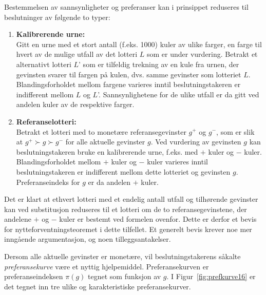 {{Bestemmelsen av sannsynligheter og preferanser kan i prinsippet reduseres til
beslutninger av følgende to typer:

\begin{enumerate}
\item {\bf Kalibrerende urne:}\\
      Gitt en urne med et stort antall (f.eks. 1000) kuler av ulike farger,
      en farge til hvert
      av de mulige utfall av det lotteri $L$ som er under vurdering.
      Betrakt et alternativt lotteri $L$' som er tilfeldig trekning av en kule
      fra urnen, der gevinsten svarer til fargen på kulen, dvs. samme 
      gevinster som lotteriet $L$.                            
      Blandingsforholdet mellom fargene varieres inntil beslutningstakeren
      er indifferent mellom $L$ og $L$'. Sannsynlighetene for de ulike utfall
      er da gitt ved andelen kuler av de respektive farger.
\item {\bf Referanselotteri:}\\
      Betrakt et lotteri med to monetære referansegevinster $g^+$ og $g^-$, som er
      slik at $g^+\succ g\succ g^-$ for alle aktuelle gevinster $g$.
      Ved vurdering av gevinsten $g$ kan beslutningstakeren bruke en
      kalibrerende urne, f.eks. med $+$ kuler og $-$ kuler. 
      Blandingsforholdet mellom $+$ kuler og $-$ kuler varieres inntil
      beslutningstakeren er indifferent mellom dette lotteriet og gevinsten
      $g$. Preferanseindeks for $g$ er da andelen $+$ kuler.
\end{enumerate}
Det er klart at ethvert lotteri med et endelig antall utfall og tilhørende
gevinster kan ved substitusjon reduseres til et lotteri om de to 
referansegevinstene, der andelene $+$ og $-$ kuler er bestemt ved formelen
ovenfor. Dette er derfor et bevis for nytteforventningsteoremet i dette
tilfellet. Et generelt bevis krever noe mer inngående argumentasjon,
og noen tilleggsantakelser.

Dersom alle aktuelle gevinster er monetære, vil beslutningstakerens
såkalte {\em preferansekurve} være et nyttig hjelpemiddel.
Preferansekurven er preferanseindeksen $\pi(g)$ tegnet som funksjon av 
$g$. I Figur~\ref{fig:prefkurve16} er det tegnet inn tre ulike og karakteristiske 
preferansekurver.

}}
